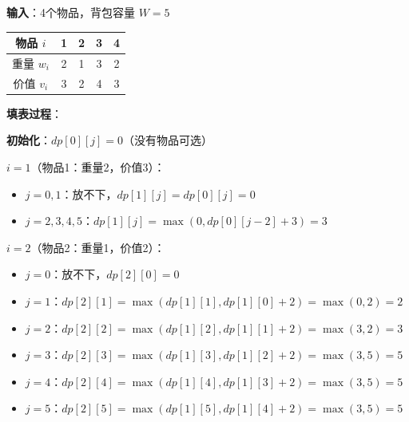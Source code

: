 \documentclass[12pt, a4paper]{ctexart}
\begin{document}
\begin{blackboard}

\textbf{输入}：4个物品，背包容量 $W = 5$

\begin{center}
\begin{tabular}{c|cccc}
物品 $i$ & 1 & 2 & 3 & 4 \\
\hline
重量 $w_i$ & 2 & 1 & 3 & 2 \\
价值 $v_i$ & 3 & 2 & 4 & 3 \\
\end{tabular}
\end{center}

\textbf{填表过程}：

\textbf{初始化}：$dp[0][j] = 0$（没有物品可选）

\textbf{$i = 1$}（物品1：重量2，价值3）：
\begin{itemize}
    \item $j = 0, 1$：放不下，$dp[1][j] = dp[0][j] = 0$
    \item $j = 2, 3, 4, 5$：$dp[1][j] = \max(0, dp[0][j-2] + 3) = 3$
\end{itemize}

\textbf{$i = 2$}（物品2：重量1，价值2）：
\begin{itemize}
    \item $j = 0$：放不下，$dp[2][0] = 0$
    \item $j = 1$：$dp[2][1] = \max(dp[1][1], dp[1][0] + 2) = \max(0, 2) = 2$
    \item $j = 2$：$dp[2][2] = \max(dp[1][2], dp[1][1] + 2) = \max(3, 2) = 3$
    \item $j = 3$：$dp[2][3] = \max(dp[1][3], dp[1][2] + 2) = \max(3, 5) = 5$
    \item $j = 4$：$dp[2][4] = \max(dp[1][4], dp[1][3] + 2) = \max(3, 5) = 5$
    \item $j = 5$：$dp[2][5] = \max(dp[1][5], dp[1][4] + 2) = \max(3, 5) = 5$
\end{itemize}

\end{blackboard}
\end{document}
